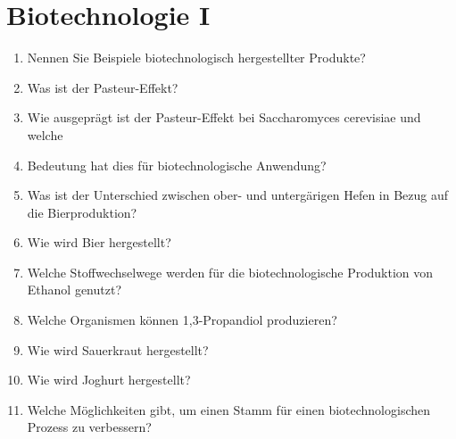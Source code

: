 
\section{Biotechnologie I}
\begin{enumerate}
	\item Nennen Sie Beispiele biotechnologisch hergestellter Produkte?
	\item Was ist der Pasteur-Effekt?
	\item Wie ausgeprägt ist der Pasteur-Effekt bei Saccharomyces cerevisiae und welche
	\item Bedeutung hat dies für biotechnologische Anwendung?
	\item Was ist der Unterschied zwischen ober- und untergärigen Hefen in Bezug auf die Bierproduktion?
	\item Wie wird Bier hergestellt?
	\item Welche Stoffwechselwege werden für die biotechnologische Produktion von Ethanol genutzt?
	\item Welche Organismen können 1,3-Propandiol produzieren?
	\item Wie wird Sauerkraut hergestellt?
	\item Wie wird Joghurt hergestellt?
	\item Welche Möglichkeiten gibt, um einen Stamm für einen biotechnologischen Prozess zu verbessern?
\end{enumerate}

